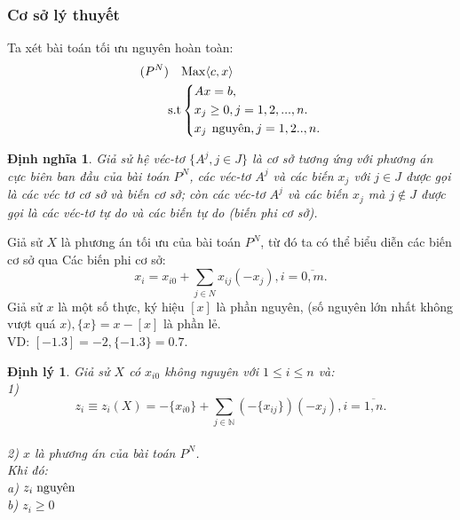 \documentclass[12pt,a4paper]{report}
\newtheorem{dn}{Định nghĩa}
\newtheorem{dl}{Định lý}
\begin{document}
\subsubsection{Cơ sở lý thuyết}
Ta xét bài toán tối ưu nguyên hoàn toàn:\\
\begin{equation}\label{Gomory1}
     \begin{split}
      (P^N) \quad    & {\rm{Max}} \langle c,x \rangle\\
          \rm{s.t} &\left\{\begin{split}
            & Ax= b,\\
           & x_j \ge 0, j=1,2,...,n.\\
            & x_j \hspace{0.15cm} \text{nguyên}, j=1,2..,n.\\
           \end{split}\right.
       \end{split}
   \end{equation}
   \begin{dn}
     Giả  sử hệ véc-tơ $\{A^j,j\in J\}$ là cơ sở tương ứng với phương án cực biên ban đầu của bài toán $P^N$, các véc-tơ $A^j$ và các biến $x_j$ với $j\in J$ được gọi là các véc tơ cơ sở và biến cơ sở; còn các véc-tơ $A^j$ và các biến $x_j$ mà $j \notin J$ được gọi là các véc-tơ tự do và các biến tự do (biến phi cơ sở).\\  
   \end{dn}
    Giả sử $X$ là phương án  tối ưu của bài toán $P^N$, từ đó ta có thể biểu diễn các biến cơ sở qua Các biến phi cơ sở:\\
   \begin{equation}\label{2.4}
       x_{i}=x_{i0} + \sum_{j \in N} x_{ij}(-x_j), i=\overline{0,m}.
   \end{equation}
    Giả sử $x$ là một số thực, ký hiệu $[x]$ là phần nguyên, (số nguyên lớn nhất không vượt quá $x), \{x\}=x-[x]$ là phần lẻ.\\
    VD: $[-1.3]=-2, \{-1.3\}=0.7$.\\
    \begin{dl}
        Giả sử $X$ có $x_{i0}$ không nguyên với $1\le i\le n$ và:\\
        1)\begin{equation}\label{2.5}
            z_i\equiv z_i(X)= -\{x_{i0}\} + \sum_{j \in \mathbb {N} }(-\{x_{ij}\})(-x_{j}), i=\overline{1,n}.
        \end{equation} \\
        2) $x$ là phương án của bài toán $P^N$.\\
        Khi đó:\\
        a) $z_i \hspace{0.1cm} \text{nguyên}$\\
        b) $z_i \ge 0$ 
        \end{dl}
\end{document}
